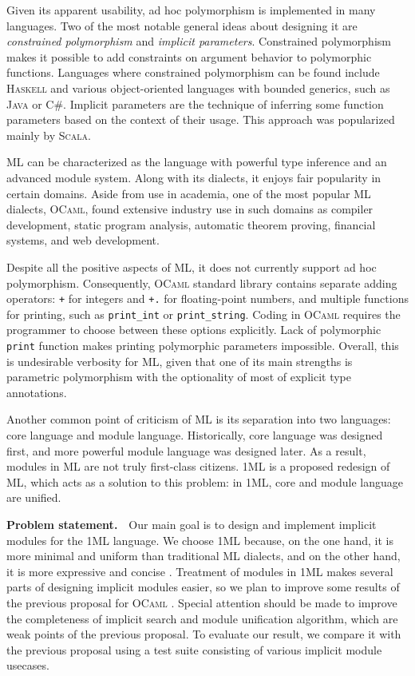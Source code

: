 \documentclass{spbau-diploma}
\begin{document}
Given its apparent usability, ad hoc polymorphism is implemented in many languages. Two of the most notable general ideas about designing it are \textit{constrained polymorphism} and \textit{implicit parameters}. Constrained polymorphism makes it possible to add constraints on argument behavior to polymorphic functions. Languages where constrained polymorphism can be found include \textsc{Haskell} and various object-oriented languages with bounded generics, such as \textsc{Java} or \textsc{C\#}. Implicit parameters are the technique of inferring some function parameters based on the context of their usage. This approach was popularized mainly by \textsc{Scala}.

\textsc{ML} can be characterized as the language with powerful type inference and an advanced module system. Along with its dialects, it enjoys fair popularity in certain domains. Aside from use in academia, one of the most popular \textsc{ML} dialects, \textsc{OCaml}, found extensive industry use in such domains as compiler development, static program analysis, automatic theorem proving, financial systems, and web development. 

Despite all the positive aspects of \textsc{ML}, it does not currently support ad hoc polymorphism. Consequently, \textsc{OCaml} standard library contains separate adding operators: \texttt{+} for integers and \texttt{+.} for floating-point numbers, and multiple functions for printing, such as \texttt{print\_int} or \texttt{print\_string}. Coding in \textsc{OCaml} requires the programmer to choose between these options explicitly. Lack of polymorphic \texttt{print} function makes printing polymorphic parameters impossible. Overall, this is undesirable verbosity for \textsc{ML}, given that one of its main strengths is parametric polymorphism with the optionality of most of explicit type annotations.

Another common point of criticism of \textsc{ML} is its separation into two languages: core language and module language. Historically, core language was designed first, and more powerful module language was designed later. As a result, modules in \textsc{ML} are not truly first-class citizens. \textsc{1ML} \citep{1ml} is a proposed redesign of ML, which acts as a solution to this problem: in 1ML, core and module language are unified.

\textbf{Problem statement.}~~Our main goal is to design and implement implicit modules for the \textsc{1ML} language. We choose \textsc{1ML} because, on the one hand, it is more minimal and uniform than traditional \textsc{ML} dialects, and on the other hand, it is more expressive and concise \citep{1ml}. Treatment of modules in \textsc{1ML} makes several parts of designing implicit modules easier, so we plan to improve some results of the previous proposal for \textsc{OCaml} \citep{white}. Special attention should be made to improve the completeness of implicit search and module unification algorithm, which are weak points of the previous proposal. To evaluate our result, we compare it with the previous proposal using a test suite consisting of various implicit module usecases.
\end{document}
